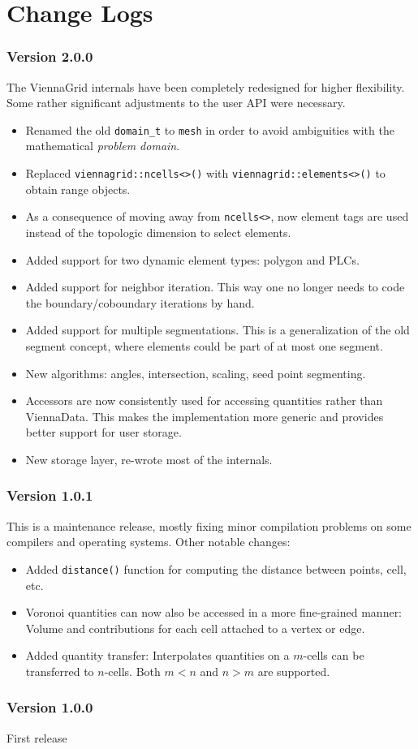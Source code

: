 
\chapter{Change Logs}

\subsection*{Version 2.0.0}
The ViennaGrid internals have been completely redesigned for higher flexibility.
Some rather significant adjustments to the user API were necessary.
\begin{itemize}
 \item Renamed the old \lstinline|domain_t| to \lstinline|mesh| in order to avoid ambiguities with the mathematical \emph{problem domain}.
 \item Replaced \lstinline|viennagrid::ncells<>()| with \lstinline|viennagrid::elements<>()| to obtain range objects.
 \item As a consequence of moving away from \lstinline|ncells<>|, now element tags are used instead of the topologic dimension to select elements.
 \item Added support for two dynamic element types: polygon and PLCs.
 \item Added support for neighbor iteration. This way one no longer needs to code the boundary/coboundary iterations by hand.
 \item Added support for multiple segmentations. This is a generalization of the old segment concept, where elements could be part of at most one segment.
 \item New algorithms: angles, intersection, scaling, seed point segmenting.
 \item Accessors are now consistently used for accessing quantities rather than ViennaData. This makes the implementation more generic and provides better support for user storage.
 \item New storage layer, re-wrote most of the internals.
\end{itemize}

\subsection*{Version 1.0.1}
This is a maintenance release, mostly fixing minor compilation problems on some compilers and operating systems. Other notable changes:
\begin{itemize}
  \item Added \lstinline|distance()| function for computing the distance between points, cell, etc.
  \item Voronoi quantities can now also be accessed in a more fine-grained manner: Volume and contributions for each cell attached to a vertex or edge.
  \item Added quantity transfer: Interpolates quantities on a $m$-cells can be transferred to $n$-cells. Both $m<n$ and $n>m$ are supported.
\end{itemize}

\subsection*{Version 1.0.0}
First release
